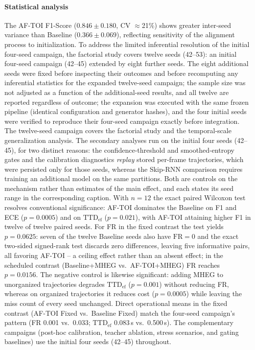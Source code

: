 \documentclass[a4paper,fleqn]{cas-dc}
\newcommand{\AFTOI}{\mbox{AF-TOI}\xspace}
\begin{document}
\paragraph{Statistical analysis}
The \AFTOI F1-Score ({\color{\revcolor}$0.846 \pm 0.180$, CV $\approx$21\%}) shows greater
inter-seed variance than Baseline ({\color{\revcolor}$0.366 \pm 0.069$}), reflecting sensitivity of
the alignment process to initialization.
{\color{\revcolor}To address the limited inferential resolution of the
initial four-seed campaign, the factorial study covers twelve seeds (42--53): an initial four-seed
campaign (42--45) extended by eight further seeds.
The eight additional seeds were fixed before inspecting their outcomes and
before recomputing any inferential statistics for the expanded twelve-seed
campaign; the sample size was not adjusted as a function of the
additional-seed results, and all twelve are reported regardless of outcome; the expansion
was executed with the same frozen pipeline (identical configuration and
generator hashes), and the four initial seeds were verified to reproduce
their four-seed campaign exactly before integration.
{\color{\revcolor}The twelve-seed campaign covers the factorial study and the
temporal-scale generalization analysis. The secondary analyses run on the
initial four seeds (42--45), for two distinct reasons: the confidence-threshold
and smoothed-entropy gates and the calibration diagnostics \emph{replay} stored
per-frame trajectories, which were persisted only for those seeds, whereas the
Skip-RNN comparison requires training an additional model on the same
partitions. Both are controls on the mechanism rather than estimates of the
main effect, and each states its seed range in the corresponding caption.}
With $n=12$ the exact
paired Wilcoxon test resolves conventional significance:
\mbox{AF-TOI} dominates the Baseline on F1 and ECE ($p=0.0005$) and on
$\mathrm{TTD}_{\mathrm{ef}}$ ($p=0.021$), with \mbox{AF-TOI} attaining higher
F1 in twelve of twelve paired seeds. For FR in the fixed contrast the test
yields $p=0.0625$: seven of the twelve Baseline seeds also have $\mathrm{FR}=0$
and the exact two-sided signed-rank test discards zero differences, leaving
five informative pairs, all favoring \mbox{AF-TOI} -- a ceiling effect rather
than an absent effect; in the scheduled contrast (Baseline+MHEG vs.\
\mbox{AF-TOI}+MHEG) FR reaches $p=0.0156$. The negative control is likewise
significant: adding \mbox{MHEG} to unorganized trajectories degrades
$\mathrm{TTD}_{\mathrm{ef}}$ ($p=0.001$) without reducing FR, whereas on
organized trajectories it reduces cost ($p=0.0005$) while leaving the miss
count of every seed unchanged. Direct operational means in the fixed contrast
(\mbox{AF-TOI} Fixed vs.\ Baseline Fixed) match the four-seed campaign's
pattern (FR 0.001 vs.\ 0.033; $\mathrm{TTD}_{\mathrm{ef}}$ 0.083\,s vs.\
0.500\,s). The complementary campaigns (post-hoc calibration, teacher
ablation, stress scenarios, and gating baselines) use the initial four
seeds (42--45) throughout.}
\end{document}
